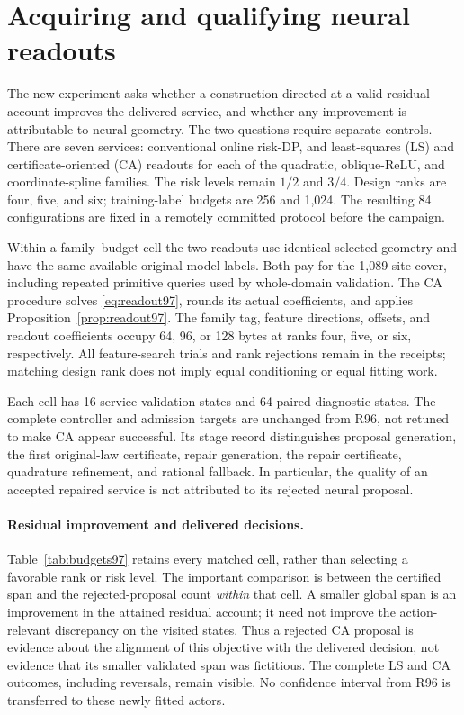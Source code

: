 \section{Acquiring and qualifying neural readouts}\label{sec:study97}
The new experiment asks whether a construction directed at a valid residual account improves the delivered service, and whether any improvement is attributable to neural geometry. The two questions require separate controls. There are seven services: conventional online risk-DP, and least-squares (LS) and certificate-oriented (CA) readouts for each of the quadratic, oblique-ReLU, and coordinate-spline families. The risk levels remain $1/2$ and $3/4$. Design ranks are four, five, and six; training-label budgets are 256 and 1,024. The resulting 84 configurations are fixed in a remotely committed protocol before the campaign.

Within a family--budget cell the two readouts use identical selected geometry and have the same available original-model labels. Both pay for the 1,089-site cover, including repeated primitive queries used by whole-domain validation. The CA procedure solves \eqref{eq:readout97}, rounds its actual coefficients, and applies Proposition~\ref{prop:readout97}. The family tag, feature directions, offsets, and readout coefficients occupy 64, 96, or 128 bytes at ranks four, five, or six, respectively. All feature-search trials and rank rejections remain in the receipts; matching design rank does not imply equal conditioning or equal fitting work.

Each cell has 16 service-validation states and 64 paired diagnostic states. The complete controller and admission targets are unchanged from R96, not retuned to make CA appear successful. Its stage record distinguishes proposal generation, the first original-law certificate, repair generation, the repair certificate, quadrature refinement, and rational fallback. In particular, the quality of an accepted repaired service is not attributed to its rejected neural proposal.




\paragraph{Residual improvement and delivered decisions.}
Table~\ref{tab:budgets97} retains every matched cell, rather than selecting a favorable rank or risk level. The important comparison is between the certified span and the rejected-proposal count \emph{within} that cell. A smaller global span is an improvement in the attained residual account; it need not improve the action-relevant discrepancy on the visited states. Thus a rejected CA proposal is evidence about the alignment of this objective with the delivered decision, not evidence that its smaller validated span was fictitious. The complete LS and CA outcomes, including reversals, remain visible. No confidence interval from R96 is transferred to these newly fitted actors.

